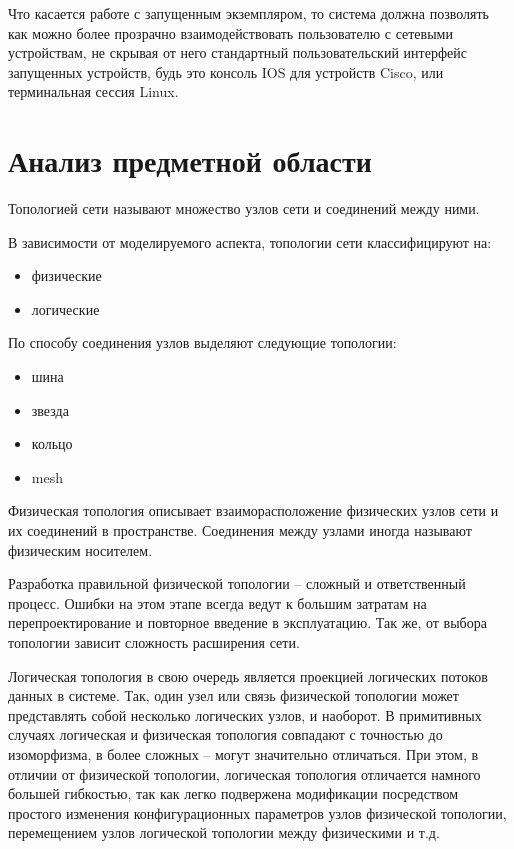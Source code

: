 Что касается работе с запущенным экземпляром, то система должна позволять как можно более прозрачно взаимодействовать
пользователю с сетевыми устройствам, не скрывая от него стандартный пользовательский интерфейс запущенных устройств,
будь это консоль IOS для устройств Cisco, или терминальная сессия Linux.


\section{Анализ предметной области}

Топологией  сети называют множество узлов сети и соединений между ними. 

В зависимости от моделируемого аспекта, топологии сети классифицируют на:
\begin{itemize}
    \item физические
    \item логические
\end{itemize}

По способу соединения узлов выделяют следующие топологии:
\begin{itemize}
    \item шина
    \item звезда
    \item кольцо
    \item mesh %
\end{itemize}

Физическая топология описывает взаиморасположение физических узлов сети и их соединений в 
пространстве. Соединения между узлами иногда называют физическим носителем.

Разработка правильной физической топологии -- сложный и ответственный процесс.
Ошибки на этом этапе всегда ведут к большим затратам на перепроектирование и повторное 
введение в эксплуатацию. Так же, от выбора топологии зависит сложность расширения
сети.

Логическая топология в свою очередь является проекцией логических потоков данных
в системе. Так, один узел или связь физической топологии может представлять собой несколько 
логических узлов, и наоборот. В примитивных случаях логическая и физическая топология 
совпадают с точностью до изоморфизма, в более сложных -- могут значительно отличаться.
При этом, в отличии от физической топологии, логическая топология отличается намного
большей гибкостью, так как легко подвержена модификации посредством простого
изменения конфигурационных параметров узлов физической топологии, перемещением
узлов логической топологии между физическими и т.д.

